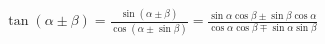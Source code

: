 \documentclass[preview]{standalone}
\begin{document}
\begin{align*}
\tan(\alpha \pm \beta) = \frac{\sin(\alpha\pm\beta)}{\cos(\alpha\pm\sin\beta)} = \frac{\sin\alpha\cos\beta\pm\sin\beta\cos\alpha}{\cos\alpha\cos\beta\mp\sin\alpha\sin\beta}
\end{align*}
\end{document}
